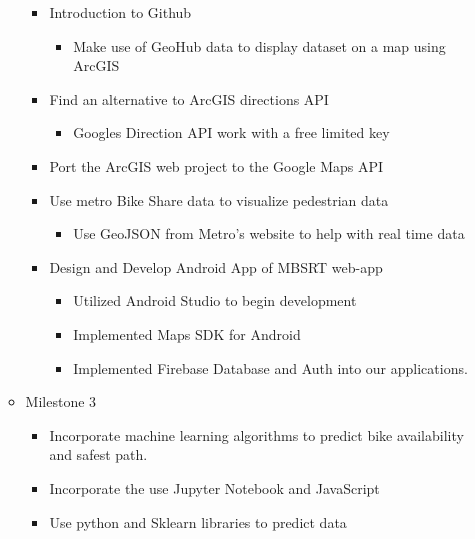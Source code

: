 \documentclass[a4paper,12pt]{article}
\begin{document}
\begin{itemize}
\begin{itemize}
\begin{itemize}
                                \item Introduction to Github
                                    \begin{itemize}
                                        \item Make use of GeoHub data to display dataset on a map using ArcGIS
                                    \end{itemize}
                                \item Find an alternative to ArcGIS directions API
                                    \begin{itemize}
                                        \item Googles Direction API work with a free limited key
                                    \end{itemize}
                                \item Port the ArcGIS web project to the Google Maps API
                                \item Use metro Bike Share data to visualize pedestrian data
                                    \begin{itemize}
                                        \item Use GeoJSON from Metro’s website to help with real time data
                                    \end{itemize}
                                \item Design and Develop Android App of MBSRT web-app
                                    \begin{itemize}
                                        \item Utilized Android Studio to begin development
                                        \item Implemented Maps SDK for Android
                                        \item Implemented Firebase Database and Auth into our applications.
                                    \end{itemize}                
                            \end{itemize}
                        \item Milestone 3
                            \begin{itemize}
                                \item Incorporate machine learning algorithms to predict bike availability and safest path.
                                \item Incorporate the use Jupyter Notebook and JavaScript
                                \item Use python and Sklearn libraries to predict data
                            \end{itemize}
                    \end{itemize}
            \end{itemize}
\end{document}
